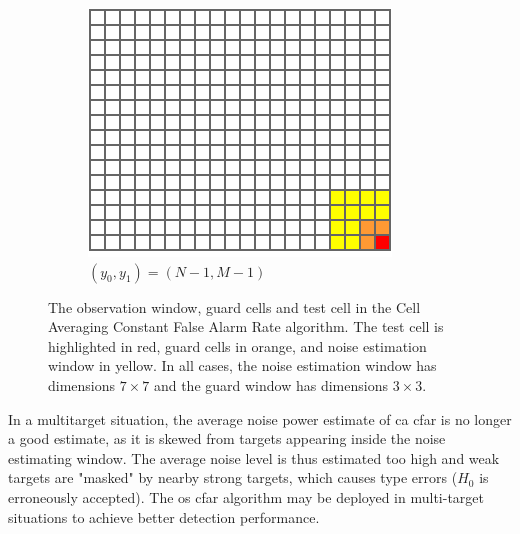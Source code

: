 \begin{figure}
    \hfill
    \begin{subfigure}[b]{0.3\textwidth}
        \centering
        \includegraphics[width=\textwidth]{fig/4/ca-cfar-window-3.pdf}
        \caption{$(y_0, y_1) = (N-1, M-1)$}
    \end{subfigure}
    \caption{
        The observation window, guard cells and test cell in the Cell Averaging Constant False Alarm Rate algorithm.
        The test cell is highlighted in red, guard cells in orange, and noise estimation window in yellow.
        In all cases, the noise estimation window has dimensions $7 \times 7$ and the guard window has dimensions $3 \times 3$.
    }
    \label{fig:ca-cfar-window}
\end{figure}

In a multitarget situation, the average noise power estimate of \gls{ca} \gls{cfar} is no longer a good estimate,
as it is skewed from targets appearing inside the noise estimating window.
The average noise level is thus estimated too high and weak targets are "masked" by nearby strong targets,
which causes type  errors ($H_0$ is erroneously accepted).
The \gls{os} \gls{cfar} algorithm may be deployed in multi-target situations to achieve better detection performance. \cite{nato-radar-topics}

